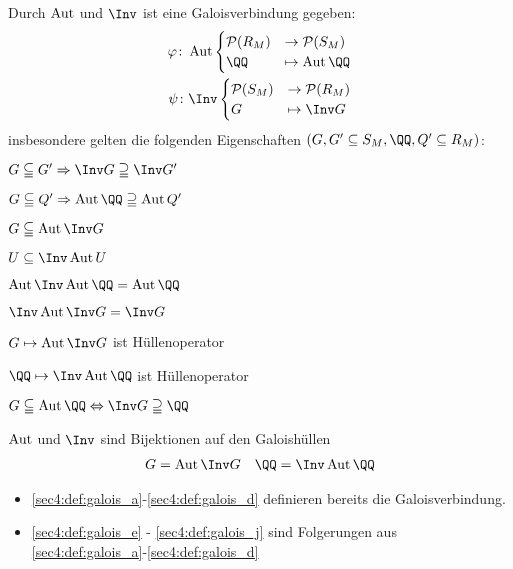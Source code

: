 \begin{definition}
	\label{sec4:def:galois}
	Durch $\operatorname{Aut}$ und $\Inv$ ist eine Galoisverbindung gegeben:
	\begin{align*}
		\phi \colon \Aut \begin{cases}
			\powerset(R_M) &\to \powerset(S_M)\\
			\QQ &\mapsto \Aut \QQ\\
		\end{cases}\\
		\psi \colon \Inv \begin{cases}
			\powerset(S_M) &\to \powerset(R_M)\\
			G &\mapsto \Inv G
		\end{cases}
	\end{align*}
	insbesondere gelten die folgenden Eigenschaften $(G,G' \subseteq S_M, \QQ, Q'\subseteq R_M)$:
	\begin{defenum}
		\item $G \subseteqq G' \implies \Inv G \supseteqq \Inv G'$ \label{sec4:def:galois_a}
		\item $G \subseteqq Q' \implies \Aut \QQ \supseteqq \Aut Q'$ \label{sec4:def:galois_b}
		\item $G \subseteqq \Aut \Inv G$ \label{sec4:def:galois_c}
		\item $U \subseteq \Inv \Aut U$  \label{sec4:def:galois_d}
		\item $\Aut \Inv \Aut \QQ = \Aut \QQ$ \label{sec4:def:galois_e}
		\item $\Inv \Aut \Inv G = \Inv G$ \label{sec4:def:galois_f}
		\item $G \mapsto \Aut \Inv G$ ist Hüllenoperator  \label{sec4:def:galois_g}
		\item $\QQ \mapsto \Inv \Aut \QQ$ ist Hüllenoperator \label{sec4:def:galois_h}
		\item $G \subseteqq \Aut \QQ \equival \Inv G \supseteqq \QQ$ \label{sec4:def:galois_i}
		\item $\operatorname{Aut}$ und $\Inv$ sind Bijektionen auf den Galoishüllen
		\begin{align*}
			G = \Aut \Inv G \quad \QQ = \Inv \Aut \QQ
		\end{align*} \label{sec4:def:galois_j}
	\end{defenum}
\end{definition}
\begin{*remark}
	\begin{itemize}
		\item \cref{sec4:def:galois_a}-\cref{sec4:def:galois_d} definieren bereits die Galoisverbindung.
		\item \cref{sec4:def:galois_e} - \cref{sec4:def:galois_j} sind Folgerungen aus \cref{sec4:def:galois_a}-\cref{sec4:def:galois_d}
	\end{itemize}
\end{*remark}
